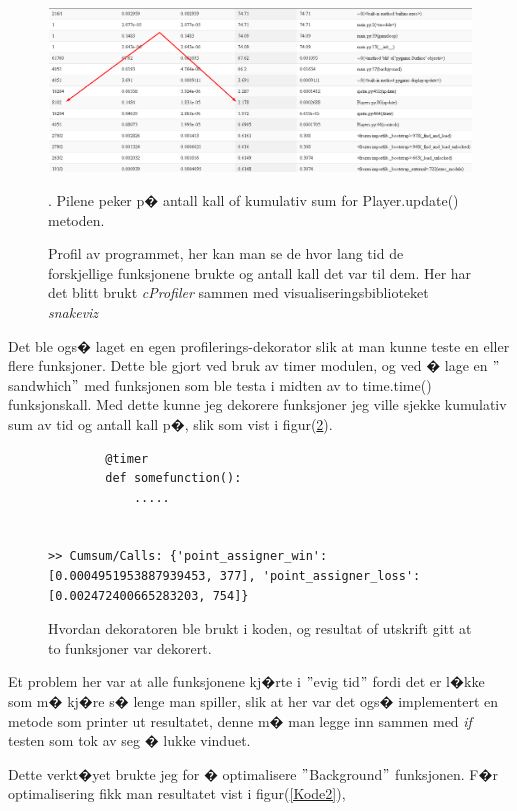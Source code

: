 {    \begin{figure}[hbt!]
    {\centering
        \includegraphics[width=1\textwidth]{profiling.png}
        \caption{Profil av programmet, her kan man se de hvor lang tid de forskjellige funksjonene brukte og antall kall det var til dem. Her har det blitt brukt \emph{cProfiler} sammen med visualiseringsbiblioteket \emph{snakeviz}}. Pilene peker p� antall kall of kumulativ sum for Player.update() metoden.
        \label{profilings}
    \par}
    \end{figure}

    Det ble ogs� laget en egen profilerings-dekorator slik at man kunne teste en eller flere funksjoner. Dette ble gjort ved bruk av timer modulen, og ved � lage en $"$sandwhich$"$ med funksjonen som ble testa i midten av to time.time() funksjonskall. Med dette kunne jeg dekorere funksjoner jeg ville sjekke kumulativ sum av tid og antall kall p�, slik som vist i figur(\ref{Kode1}).

    \begin{figure}[hbt!]
        \begin{lstlisting}
        @timer 
        def somefunction():
            .....


>> Cumsum/Calls: {'point_assigner_win': [0.0004951953887939453, 377], 'point_assigner_loss': [0.002472400665283203, 754]}
        \end{lstlisting}
    \caption{Hvordan dekoratoren ble brukt i koden, og resultat of utskrift gitt at to funksjoner var dekorert.}
    \label{Kode1}
    \end{figure}

Et problem her var at alle funksjonene kj�rte i $"$evig tid$"$ fordi det er l�kke som m� kj�re s� lenge man spiller, slik at her var det ogs� implementert en metode som printer ut resultatet, denne m� man legge inn sammen med \emph{if} testen som tok av seg � lukke vinduet.

Dette verkt�yet brukte jeg for � optimalisere $"$Background$"$ funksjonen. F�r optimalisering fikk man resultatet vist i figur(\ref{Kode2}), 

}
